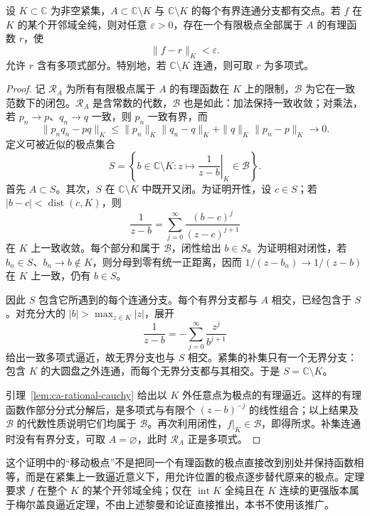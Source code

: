 \begin{theorem}
\label{thm:ca-runge}
设 $K\subset\mathbb C$ 为非空紧集，$A\subset\mathbb C\setminus K$ 与 $\mathbb C\setminus K$ 的每个有界连通分支都有交点。若 $f$ 在 $K$ 的某个开邻域全纯，则对任意 $\varepsilon>0$，存在一个有限极点全部属于 $A$ 的有理函数 $r$，使
\[
 \|f-r\|_K<\varepsilon.
\]
允许 $r$ 含有多项式部分。特别地，若 $\mathbb C\setminus K$ 连通，则可取 $r$ 为多项式。
\end{theorem}
\begin{proof}
记 $\mathcal R_A$ 为所有有限极点属于 $A$ 的有理函数在 $K$ 上的限制，$\mathcal B$ 为它在一致范数下的闭包。$\mathcal R_A$ 是含常数的代数，$\mathcal B$ 也是如此：加法保持一致收敛；对乘法，若 $p_n\to p$、$q_n\to q$ 一致，则 $p_n$ 一致有界，而
\[
 \|p_nq_n-pq\|_K
 \le\|p_n\|_K\|q_n-q\|_K+\|q\|_K\|p_n-p\|_K\longrightarrow0.
\]
定义可被近似的极点集合
\[
 S=\left\{b\in\mathbb C\setminus K:
       \left.z\mapsto\frac1{z-b}\right|_K\in\mathcal B\right\}.
\]
首先 $A\subset S$。其次，$S$ 在 $\mathbb C\setminus K$ 中既开又闭。为证明开性，设 $c\in S$；若 $|b-c|<\operatorname{dist}(c,K)$，则
\[
 \frac1{z-b}=\sum_{j=0}^{\infty}\frac{(b-c)^j}{(z-c)^{j+1}}
\]
在 $K$ 上一致收敛。每个部分和属于 $\mathcal B$，闭性给出 $b\in S$。为证明相对闭性，若 $b_n\in S$、$b_n\to b\notin K$，则分母到零有统一正距离，因而 $1/(z-b_n)\to1/(z-b)$ 在 $K$ 上一致，仍有 $b\in S$。

因此 $S$ 包含它所遇到的每个连通分支。每个有界分支都与 $A$ 相交，已经包含于 $S$。对充分大的 $|b|>\max_{z\in K}|z|$，展开
\[
 \frac1{z-b}=-\sum_{j=0}^{\infty}\frac{z^j}{b^{j+1}}
\]
给出一致多项式逼近，故无界分支也与 $S$ 相交。紧集的补集只有一个无界分支：包含 $K$ 的大圆盘之外连通，而每个无界分支都与其相交。于是 $S=\mathbb C\setminus K$。

引理~\ref{lem:ca-rational-cauchy} 给出以 $K$ 外任意点为极点的有理逼近。这样的有理函数作部分分式分解后，是多项式与有限个 $(z-b)^{-j}$ 的线性组合；以上结果及 $\mathcal B$ 的代数性质说明它们均属于 $\mathcal B$。再次利用闭性，$f|_K\in\mathcal B$，即得所求。补集连通时没有有界分支，可取 $A=\varnothing$，此时 $\mathcal R_A$ 正是多项式。
\end{proof}

这个证明中的“移动极点”不是把同一个有理函数的极点直接改到别处并保持函数相等，而是在紧集上一致逼近意义下，用允许位置的极点逐步替代原来的极点。定理要求 $f$ 在整个 $K$ 的某个开邻域全纯；仅在 $\operatorname{int}K$ 全纯且在 $K$ 连续的更强版本属于梅尔盖良逼近定理，不由上述黎曼和论证直接推出，本书不使用该推广。

